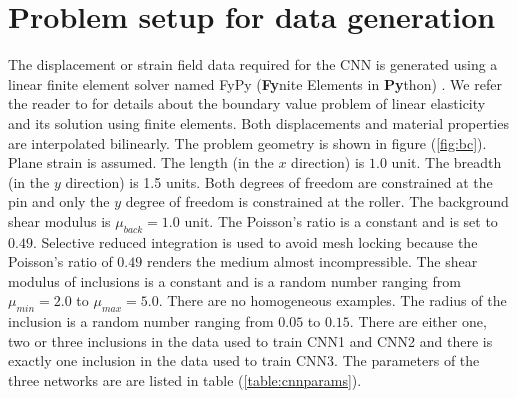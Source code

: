 \documentclass[10pt]{article}
\begin{document}
\section{\label{sect:probsetup}Problem setup for data generation}
The displacement or strain field data required for the CNN is generated using a linear finite element solver named FyPy (\textbf{Fy}nite Elements in \textbf{Py}thon) \cite{misc:fypy}. We refer the reader to \cite{book:hugheslinear,book:fishbelytschko,book:segelmathcont} for details about the boundary value problem of linear elasticity and its solution using finite elements. Both displacements and material properties are interpolated bilinearly. The problem geometry is shown in figure (\ref{fig:bc}). Plane strain is assumed. The length (in the $x$ direction) is $1.0$ unit. The breadth (in the $y$ direction) is 1.5 units. Both degrees of freedom are constrained at the pin and only the $y$ degree of freedom is constrained at the roller. The background shear modulus is $\mu_{back}=1.0$ unit. The Poisson's ratio is a constant and is set to $0.49$. Selective reduced integration is used to avoid mesh locking \cite{book:hugheslinear} because the Poisson's ratio of $0.49$ renders the medium almost incompressible. The shear modulus of inclusions is a constant and is a random number ranging from $\mu_{min}=2.0$ to $\mu_{max}=5.0$. There are no homogeneous examples. The radius of the inclusion is a random number ranging from $0.05$ to $0.15$. There are either one, two or three inclusions in the data used to train CNN1 and CNN2 and there is exactly one inclusion in the data used to train CNN3. The parameters of the three networks are are listed in table (\ref{table:cnnparams}).
\end{document}
